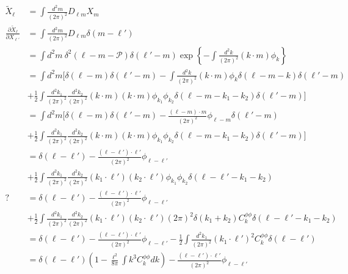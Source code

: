 \documentclass[noinfoline]{imsart}
\begin{document}
\section{}
\begin{align}
\tilde X_\ell
&= \int \frac{d^2 m}{(2\pi)^2} D_{\ell m} X_{m} \\
\frac{\partial \tilde X_\ell}{\partial X_{\ell'}}
&= \int \frac{d^2 m}{(2\pi)^2} D_{\ell m} \delta(m-\ell')\\
&= \int d^2 m \ \delta^2(\ell - m - \mathcal P) \delta(\ell'-m)
\exp\left\{-\int \frac{d^2k}{(2\pi)^2} (k\cdot m)\phi_k \right\}\\
&= \int d^2 m \Bigg[ \delta(\ell - m) \delta(\ell'-m)
-\int \frac{d^2k}{(2\pi)^2}(k\cdot m)\phi_k\delta(\ell - m-k) \delta(\ell'-m)\\
&+\frac{1}{2}\int \frac{d^2k_1}{(2\pi)^2} \frac{d^2k_2}{(2\pi)^2} (k\cdot m)(k\cdot m)\phi_{k_1}\phi_{k_2}
\delta(\ell - m-k_1-k_2) \delta(\ell'-m) \Bigg] \\
&= \int d^2 m \Bigg[ \delta(\ell - m) \delta(\ell'-m)
- \frac{(\ell -m)\cdot m}{(2\pi)^2}\phi_{\ell-m} \delta(\ell'-m)\\
&+\frac{1}{2}\int \frac{d^2k_1}{(2\pi)^2} \frac{d^2k_2}{(2\pi)^2} (k\cdot m)(k\cdot m)\phi_{k_1}\phi_{k_2}
\delta(\ell - m-k_1-k_2) \delta(\ell'-m) \Bigg] \\
&= \delta(\ell - \ell')- \frac{(\ell -\ell')\cdot \ell'}{(2\pi)^2}\phi_{\ell-\ell'}\\
&+\frac{1}{2}\int \frac{d^2k_1}{(2\pi)^2} \frac{d^2k_2}{(2\pi)^2} (k_1\cdot \ell')(k_2\cdot \ell')\phi_{k_1}\phi_{k_2}
\delta(\ell - \ell'-k_1-k_2) \\
?&= \delta(\ell - \ell')- \frac{(\ell -\ell')\cdot \ell'}{(2\pi)^2}\phi_{\ell-\ell'}\\
&+\frac{1}{2}\int \frac{d^2k_1}{(2\pi)^2} \frac{d^2k_2}{(2\pi)^2}
(k_1\cdot \ell')(k_2\cdot \ell')(2\pi)^2\delta(k_1+k_2) C_k^{\phi\phi}
\delta(\ell - \ell'-k_1-k_2) \\
&= \delta(\ell - \ell')- \frac{(\ell -\ell')\cdot \ell'}{(2\pi)^2}\phi_{\ell-\ell'}
-\frac{1}{2}\int \frac{d^2k_1}{(2\pi)^2} (k_1\cdot \ell')^2 C_k^{\phi\phi} \delta(\ell - \ell')\\
&= \delta(\ell - \ell')\left(1- \frac{\ell^2}{8\pi}\int  k^3 C_k^{\phi\phi} dk\right)
- \frac{(\ell -\ell')\cdot \ell'}{(2\pi)^2}\phi_{\ell-\ell'}
\end{align}
\end{document}

